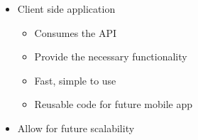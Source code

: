 \documentclass{beamer}
\begin{document}
\begin{frame}
\begin{columns}
\begin{itemize}
            \pause
            \vspace{.2cm}
            \item Client side application 
            \begin{itemize}
                \item Consumes the API
                \item Provide the necessary functionality
                \item Fast, simple to use
                \item Reusable code for future mobile app
            \end{itemize}
    
            \pause
            \vspace{.2cm}
            \item Allow for future scalability
        \end{itemize}    
    \end{columns}

\end{frame}
\end{document}

